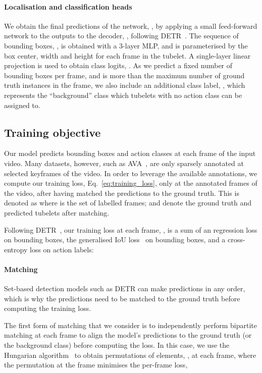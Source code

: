 \documentclass[10pt,twocolumn,letterpaper]{article}
\def \paravspace {-0.7\baselineskip}
\begin{document}
\vspace{\paravspace}
\paragraph{Localisation and classification heads}

We obtain the final predictions of the network, , by applying a small feed-forward network to the outputs to the decoder, , following DETR~\cite{carion_eccv_2020}. The sequence of bounding boxes, , is obtained with a 3-layer MLP, and is parameterised by the box center, width and height for each frame in the tubelet.
A single-layer linear projection is used to obtain class logits, .
As we predict a fixed number of   bounding boxes per frame, and  is more than the maximum number
of ground truth instances in the frame, we also include an additional class label, , which represents the ``background'' class 
 which tubelets with no action class can be assigned to.

\subsection{Training objective}
\label{sec:method_loss}

Our model predicts bounding boxes and action classes at each frame of the input video.
Many datasets, however, such as AVA~\cite{gu_cvpr_2018}, are only sparsely annotated at selected keyframes of the video.
In order to leverage the available annotations, we compute our training loss, Eq.~\ref{eq:training_loss}, only at the annotated frames of the video, after having matched the predictions to the ground truth.
This is denoted as 
where  is the set of labelled frames;  and  denote the ground truth and predicted tubelets after matching. 

Following DETR~\cite{carion_eccv_2020}, our training loss at each frame, , is a sum of an  regression loss on bounding boxes, the generalised IoU loss~\cite{rezatofighi2019generalized} on bounding boxes, and a cross-entropy loss on action labels:

\paragraph{Matching}
Set-based detection models such as DETR can make predictions in any order, which is why the predictions need to be matched to the ground truth before computing the training loss. 

The first form of matching that we consider is to independently perform bipartite matching at each frame to align the model's predictions to the ground truth (or the  background class) before computing the loss.
In this case, we use the Hungarian algorithm~\cite{kuhn1955hungarian} to obtain  permutations of  elements, , at each frame, where the permutation at the  frame minimises the per-frame loss,
\end{document}
